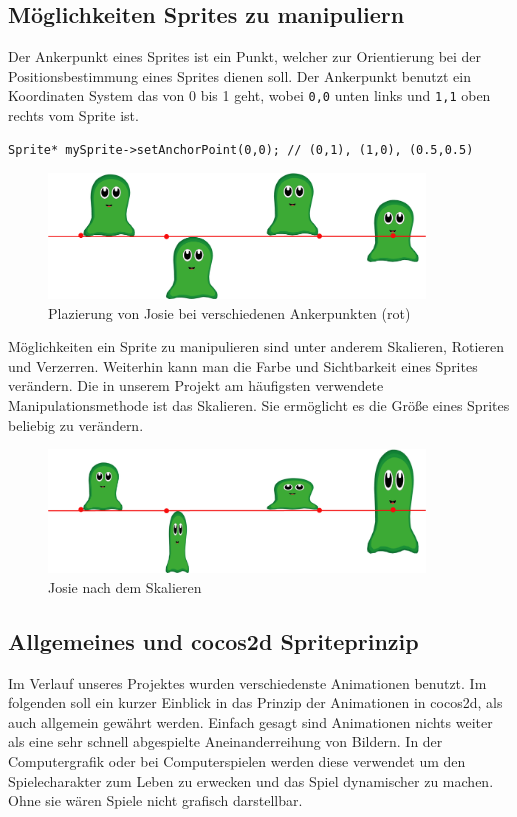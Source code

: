\subsection{Möglichkeiten Sprites zu manipuliern}
Der Ankerpunkt eines Sprites ist ein Punkt, welcher zur Orientierung bei der Positionsbestimmung eines Sprites dienen soll. Der Ankerpunkt benutzt ein Koordinaten System das von 0 bis 1 geht, wobei \texttt{0,0} unten links und \texttt{1,1} oben rechts vom Sprite ist.

\begin{lstlisting}[style=singleline]
Sprite* mySprite->setAnchorPoint(0,0); // (0,1), (1,0), (0.5,0.5)
\end{lstlisting}

\begin{figure}[H]
  \centering
  \includegraphics[width=10cm]{resources/josiedoku3}
  \caption{Plazierung von Josie bei verschiedenen Ankerpunkten (rot)}
  \label{fig:josie_ancherpoint} 
\end{figure}

Möglichkeiten ein Sprite zu manipulieren sind unter anderem Skalieren, Rotieren und Verzerren. Weiterhin kann man die Farbe und Sichtbarkeit eines Sprites verändern. Die in unserem Projekt am häufigsten verwendete Manipulationsmethode ist das Skalieren. Sie ermöglicht es die Größe eines Sprites beliebig zu verändern.

\begin{figure}[H]
 \centering
  \includegraphics[width=10cm]{resources/josiedoku4}
  \caption{Josie nach dem Skalieren}
  \label{fig:josie_scale} 
\end{figure}



\label{sec:2_Animationsprinzip}

\subsection{Allgemeines und cocos2d Spriteprinzip}
Im Verlauf unseres Projektes wurden verschiedenste Animationen benutzt. Im folgenden soll ein kurzer Einblick in das Prinzip der Animationen in cocos2d, als auch allgemein gewährt werden. Einfach gesagt sind Animationen nichts weiter als eine sehr schnell abgespielte Aneinanderreihung von Bildern. In der Computergrafik oder bei Computerspielen werden diese verwendet um den Spielecharakter zum Leben zu erwecken und das Spiel dynamischer zu machen. Ohne sie wären Spiele nicht grafisch darstellbar.

